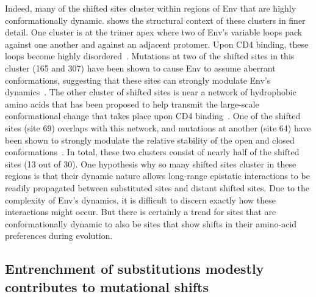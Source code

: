 \documentclass[9pt]{elife}
\begin{document}
Indeed, many of the shifted sites cluster within regions of Env that are highly conformationally dynamic.
 shows the structural context of these clusters in finer detail.
One cluster is at the trimer apex where two of Env's variable loops pack against one another and against an adjacent protomer.
Upon CD4 binding, these loops become highly disordered~\citep{guttman2014cd4,ozorowski2017open}.
Mutations at two of the shifted sites in this cluster (165 and 307) have been shown to cause Env to assume aberrant conformations, suggesting that these sites can strongly modulate Env's dynamics~\citep{lee2017broadly}.
The other cluster of shifted sites is near a network of hydrophobic amino acids that has been proposed to help transmit the large-scale conformational change that takes place upon CD4 binding~\citep{ozorowski2017open}.
One of the shifted sites (site 69) overlaps with this network, and mutations at another (site 64) have been shown to strongly modulate the relative stability of the open and closed conformations~\citep{de2015immunogenicity}.
In total, these two clusters consist of nearly half of the shifted sites (13 out of 30).
One hypothesis why so many shifted sites cluster in these regions is that their dynamic nature allows long-range epistatic interactions to be readily propagated between substituted sites and distant shifted sites.
Due to the complexity of Env's dynamics, it is difficult to discern exactly how these interactions might occur.
But there is certainly a trend for sites that are conformationally dynamic to also be sites that show shifts in their amino-acid preferences during evolution.

\subsection{Entrenchment of substitutions modestly contributes to mutational shifts}
\end{document}
